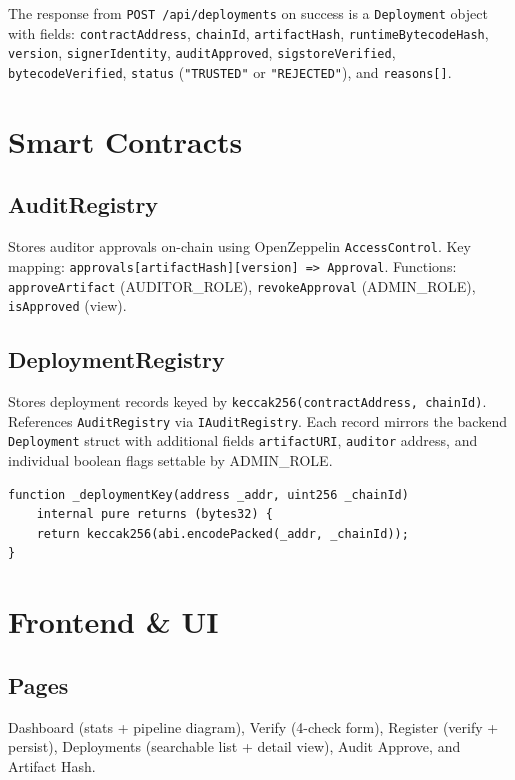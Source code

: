 \documentclass[11pt,a4paper]{article}
\begin{document}
The response from \texttt{POST /api/deployments} on success is a \texttt{Deployment}
object with fields: \texttt{contractAddress}, \texttt{chainId}, \texttt{artifactHash},
\texttt{runtimeBytecodeHash}, \texttt{version}, \texttt{signerIdentity},
\texttt{auditApproved}, \texttt{sigstoreVerified}, \texttt{bytecodeVerified},
\texttt{status} (\texttt{"TRUSTED"} or \texttt{"REJECTED"}), and \texttt{reasons[]}.

\section{Smart Contracts}

\subsection{AuditRegistry}
Stores auditor approvals on-chain using OpenZeppelin \texttt{AccessControl}.
Key mapping: \texttt{approvals[artifactHash][version] => Approval}.
Functions: \texttt{approveArtifact} (AUDITOR\_ROLE), \texttt{revokeApproval} (ADMIN\_ROLE),
\texttt{isApproved} (view).

\subsection{DeploymentRegistry}
Stores deployment records keyed by \texttt{keccak256(contractAddress, chainId)}.
References \texttt{AuditRegistry} via \texttt{IAuditRegistry}. Each record mirrors the
backend \texttt{Deployment} struct with additional fields \texttt{artifactURI},
\texttt{auditor} address, and individual boolean flags settable by ADMIN\_ROLE.

\begin{lstlisting}[language=Solidity,caption={DeploymentRegistry key function}]
function _deploymentKey(address _addr, uint256 _chainId)
    internal pure returns (bytes32) {
    return keccak256(abi.encodePacked(_addr, _chainId));
}
\end{lstlisting}

\section{Frontend \& UI}

\subsection{Pages}
Dashboard (stats + pipeline diagram), Verify (4-check form), Register (verify + persist),
Deployments (searchable list + detail view), Audit Approve, and Artifact Hash.
\end{document}
